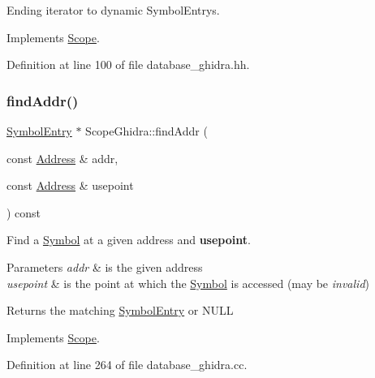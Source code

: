Ending iterator to dynamic Symbol\+Entrys. 



Implements \mbox{\hyperlink{class_scope_a37c892157b9de825a3b475581fbf4019}{Scope}}.



Definition at line 100 of file database\+\_\+ghidra.\+hh.

\mbox{\label{class_scope_ghidra_a444989f8c48787af5df27c2a8b234fd3}} 
\subsubsection{\texorpdfstring{findAddr()}{findAddr()}}
{\footnotesize\ttfamily \mbox{\hyperlink{class_symbol_entry}{Symbol\+Entry}} $\ast$ Scope\+Ghidra\+::find\+Addr (\begin{DoxyParamCaption}\item[{const \mbox{\hyperlink{class_address}{Address}} \&}]{addr,  }\item[{const \mbox{\hyperlink{class_address}{Address}} \&}]{usepoint }\end{DoxyParamCaption}) const\hspace{0.3cm}{\ttfamily [virtual]}}



Find a \mbox{\hyperlink{class_symbol}{Symbol}} at a given address and {\bfseries{usepoint}}. 


\begin{DoxyParams}{Parameters}
{\em addr} & is the given address \\
\hline
{\em usepoint} & is the point at which the \mbox{\hyperlink{class_symbol}{Symbol}} is accessed (may be {\itshape invalid}) \\
\hline
\end{DoxyParams}
\begin{DoxyReturn}{Returns}
the matching \mbox{\hyperlink{class_symbol_entry}{Symbol\+Entry}} or N\+U\+LL 
\end{DoxyReturn}


Implements \mbox{\hyperlink{class_scope_aae4ea61f9a55ddfc9defd8548654c8e5}{Scope}}.



Definition at line 264 of file database\+\_\+ghidra.\+cc.

